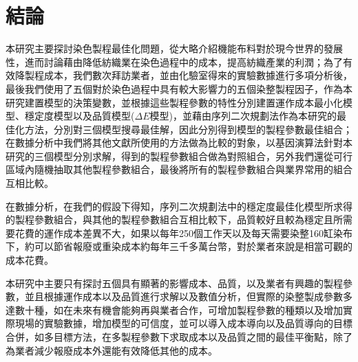 \chapter{結論}
\label{c:con}
本研究主要探討染色製程最佳化問題，從大略介紹機能布料對於現今世界的發展性，進而討論藉由降低紡織業在染色過程中的成本，提高紡織產業的利潤；為了有效降製程成本，我們數次拜訪業者，並由化驗室得來的實驗數據進行多項分析後，最後我們使用了五個對於染色過程中具有較大影響力的五個染整製程因子，作為本研究建置模型的決策變數，並根據這些製程參數的特性分別建置運作成本最小化模型、穩定度模型以及品質模型($\Delta E$模型)，並藉由序列二次規劃法作為本研究的最佳化方法，分別對三個模型搜尋最佳解，因此分別得到模型的製程參數最佳組合；在數據分析中我們將其他文獻所使用的方法做為比較的對象，以基因演算法針對本研究的三個模型分別求解，得到的製程參數組合做為對照組合，另外我們還從可行區域內隨機抽取其他製程參數組合，最後將所有的製程參數組合與業界常用的組合互相比較。

在數據分析，在我們的假設下得知，序列二次規劃法中的穩定度最佳化模型所求得的製程參數組合，與其他的製程參數組合互相比較下，品質較好且較為穩定且所需要花費的運作成本差異不大，如果以每年250個工作天以及每天需要染整160缸染布下，約可以節省報廢或重染成本約每年三千多萬台幣，對於業者來說是相當可觀的成本花費。

本研究中主要只有探討五個具有顯著的影響成本、品質，以及業者有興趣的製程參數，並且根據運作成本以及品質進行求解以及數值分析，但實際的染整製成參數多達數十種，如在未來有機會能夠再與業者合作，可增加製程參數的種類以及增加實際現場的實驗數據，增加模型的可信度，並可以導入成本導向以及品質導向的目標合併，如多目標方法，在多製程參數下求取成本以及品質之間的最佳平衡點，除了為業者減少報廢成本外還能有效降低其他的成本。
